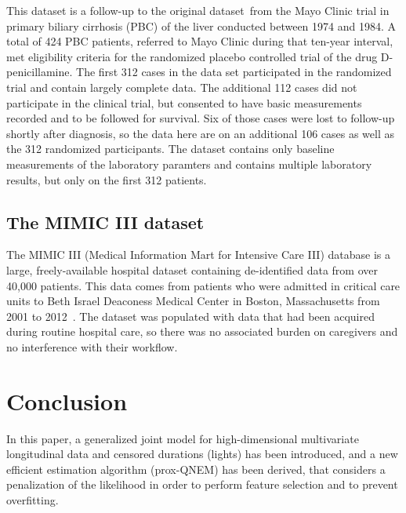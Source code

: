 \documentclass[11pt]{article}
\begin{document}
This dataset is a follow-up to the original dataset~\citep{fleming2011counting, murtaugh1994primary}from the Mayo Clinic trial in primary biliary cirrhosis (PBC) of the liver conducted between 1974 and 1984. 
A total of 424 PBC patients, referred to Mayo Clinic during that ten-year interval, met eligibility criteria for the randomized placebo controlled trial of the drug D-penicillamine. The first 312 cases in the data set participated in the randomized trial and contain largely complete data. The additional 112 cases did not participate in the clinical trial, but consented to have basic measurements recorded and to be followed for survival. Six of those cases were lost to follow-up shortly after diagnosis, so the data here are on an additional 106 cases as well as the 312 randomized participants. 
The dataset contains only baseline measurements of the laboratory paramters and contains multiple laboratory results, but only on the first 312 patients. 


\subsection{The MIMIC III dataset}

The MIMIC III (Medical Information Mart for Intensive Care III) database is a large, freely-available hospital dataset containing de-identified data from over 40,000 patients. This data comes from patients who were admitted in critical care units to Beth Israel Deaconess Medical Center in Boston, Massachusetts from 2001 to 2012~\citep{johnson2016mimic}. The dataset was populated with data that had been acquired during routine hospital care, so there was no associated burden on caregivers and no interference with their workflow.



\section{Conclusion}
\label{sec:conclusion}

In this paper, a generalized joint model for high-dimensional multivariate longitudinal data and censored durations (lights) has been introduced, and a new efficient estimation
algorithm (prox-QNEM) has been derived, that considers a penalization of the likelihood in order to perform feature
selection and to prevent overfitting.
\end{document}
